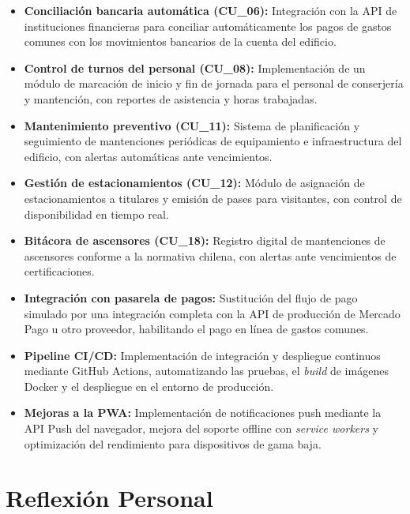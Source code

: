 \begin{itemize}
    \item \textbf{Conciliación bancaria automática (CU\_06):} Integración con la API de instituciones financieras para conciliar automáticamente los pagos de gastos comunes con los movimientos bancarios de la cuenta del edificio.

    \item \textbf{Control de turnos del personal (CU\_08):} Implementación de un módulo de marcación de inicio y fin de jornada para el personal de conserjería y mantención, con reportes de asistencia y horas trabajadas.

    \item \textbf{Mantenimiento preventivo (CU\_11):} Sistema de planificación y seguimiento de mantenciones periódicas de equipamiento e infraestructura del edificio, con alertas automáticas ante vencimientos.

    \item \textbf{Gestión de estacionamientos (CU\_12):} Módulo de asignación de estacionamientos a titulares y emisión de pases para visitantes, con control de disponibilidad en tiempo real.

    \item \textbf{Bitácora de ascensores (CU\_18):} Registro digital de mantenciones de ascensores conforme a la normativa chilena, con alertas ante vencimientos de certificaciones.

    \item \textbf{Integración con pasarela de pagos:} Sustitución del flujo de pago simulado por una integración completa con la API de producción de Mercado Pago u otro proveedor, habilitando el pago en línea de gastos comunes.

    \item \textbf{Pipeline CI/CD:} Implementación de integración y despliegue continuos mediante GitHub Actions, automatizando las pruebas, el \textit{build} de imágenes Docker y el despliegue en el entorno de producción.

    \item \textbf{Mejoras a la PWA:} Implementación de notificaciones push mediante la API Push del navegador, mejora del soporte offline con \textit{service workers} y optimización del rendimiento para dispositivos de gama baja.
\end{itemize}

\section{Reflexión Personal}

